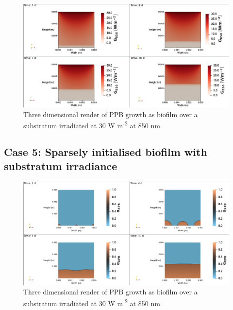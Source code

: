 \begin{figure}[H]
    \centering
    \includegraphics[width=\textwidth,height=0.4\textheight]{Chap4/results/post_processing/2D_cases/case4_rad.png}
    \caption{Three dimensional render of PPB growth as biofilm over a substratum irradiated at 30 W m\textsuperscript{-2} at 850 nm. } 
    \label{fig:case5_3D_rad}
\end{figure}

\subsection{Case 5: Sparsely initialised biofilm with substratum irradiance}
\begin{figure}[H]
    \centering
    \includegraphics[width=\textwidth,height=0.4\textheight]{Chap4/results/post_processing/2D_cases/case5_ppb.png}
    \caption{Three dimensional render of PPB growth as biofilm over a substratum irradiated at 30 W m\textsuperscript{-2} at 850 nm. } 
    \label{fig:case5_3D_rad}
\end{figure}

